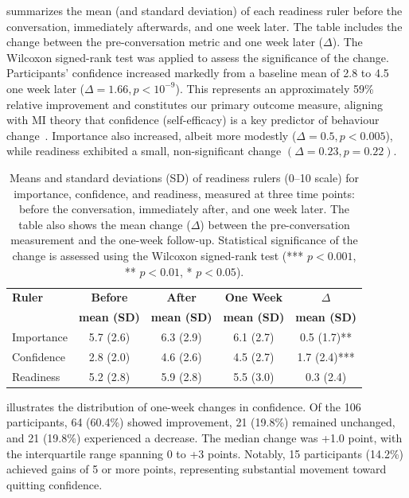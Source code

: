  summarizes the mean (and standard deviation) of each readiness ruler before the conversation, immediately afterwards, and one week later. The table includes the change between the pre-conversation metric and one week later ($\Delta$). The Wilcoxon signed-rank test was applied to assess the significance of the change. Participants' confidence increased markedly from a baseline mean of 2.8 to 4.5 one week later ($\Delta=1.66, p<10^{-9}$). This represents an approximately 59\% relative improvement and constitutes our primary outcome measure, aligning with MI theory that confidence (self-efficacy) is a key predictor of behaviour change~\citep{Gwaltney2009-wj,Abar2013}. Importance also increased, albeit more modestly ($\Delta=0.5, p<0.005$), while readiness exhibited a small, non-significant change $(\Delta=0.23, p=0.22)$.

\begin{table}[ht!]
	\centering
	\small
	\setlength{\tabcolsep}{4pt}
	\renewcommand{\arraystretch}{1.1}
	\begin{tabular}{@{}lcccc@{}}
		\toprule
		\textbf{Ruler} & \textbf{Before}    & \textbf{After}     & \textbf{One Week}  & \textbf{$\Delta$}  \\
		               & \textbf{mean (SD)} & \textbf{mean (SD)} & \textbf{mean (SD)} & \textbf{mean (SD)} \\
		\midrule
		Importance     & 5.7 (2.6)          & 6.3 (2.9)          & 6.1 (2.7)          & 0.5 (1.7)**        \\
		Confidence     & 2.8 (2.0)          & 4.6 (2.6)          & 4.5 (2.7)          & 1.7 (2.4)***       \\
		Readiness      & 5.2 (2.8)          & 5.9 (2.8)          & 5.5 (3.0)          & 0.3 (2.4)          \\
		\bottomrule
	\end{tabular}
	\caption[MIBot Readiness Ruler Summary]{Means and standard deviations (SD) of readiness rulers (0--10 scale) for importance, confidence, and readiness, measured at three time points: before the conversation, immediately after, and one week later. The table also shows the mean change ($\Delta$) between the pre-conversation measurement and the one-week follow-up. Statistical significance of the change is assessed using the Wilcoxon signed-rank test (*** $p < 0.001$, ** $p < 0.01$, * $p < 0.05$).}
	\label{table:mibot_ruler_summary}
\end{table}

 illustrates the distribution of one-week changes in confidence. Of the 106 participants, 64 (60.4\%) showed improvement, 21 (19.8\%) remained unchanged, and 21 (19.8\%) experienced a decrease. The median change was +1.0 point, with the interquartile range spanning 0 to +3 points. Notably, 15 participants (14.2\%) achieved gains of 5 or more points, representing substantial movement toward quitting confidence.

